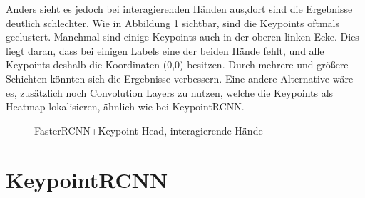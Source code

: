Anders sieht es jedoch bei interagierenden Händen aus,dort sind die Ergebnisse deutlich schlechter.
Wie in Abbildung \ref{fig:fasterrcnn_interagierend} sichtbar, sind die Keypoints oftmals geclustert.
Manchmal sind einige Keypoints auch in der oberen linken Ecke. 
Dies liegt daran, dass bei einigen Labels eine der beiden Hände fehlt, und alle Keypoints deshalb die Koordinaten (0,0) besitzen.
Durch mehrere und größere Schichten könnten sich die Ergebnisse verbessern.
Eine andere Alternative wäre es, zusätzlich noch Convolution Layers zu nutzen, welche die Keypoints als Heatmap lokalisieren, ähnlich wie bei KeypointRCNN.\\
\begin{figure}[!htb]
    \centering
    \caption{FasterRCNN+Keypoint Head, interagierende Hände}
    \label{fig:fasterrcnn_interagierend}
\end{figure}


\section{KeypointRCNN}

